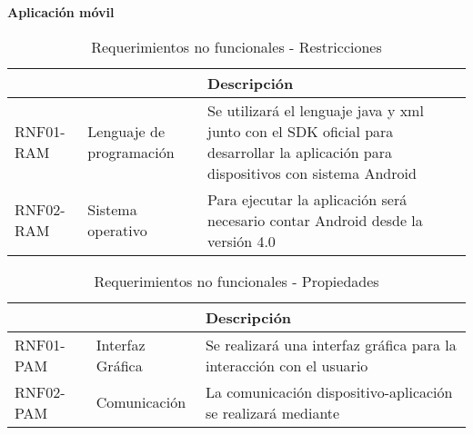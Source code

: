 \textbf{Aplicación móvil}
\begin{center}
\begin{table}[!htb]
\centering
\begin{tabular}{|p{4cm}|p{4cm}|p{5cm}|}
    \hline
    \centering {\bfseries }  & \centering {\bfseries Nombre} & {\bfseries Descripción} \\ \hline
    \centering RNF01-RAM & \centering Lenguaje de programación & Se utilizará el lenguaje java y xml junto con el SDK oficial para desarrollar la aplicación para dispositivos con sistema Android \\ \hline
    \centering RNF02-RAM & \centering Sistema operativo & Para ejecutar la aplicación será necesario contar Android desde la versión 4.0\\ \hline
\end{tabular}
\caption{Requerimientos no funcionales - Restricciones}
\label{tabla:pobconlimsincolo}
\end{table}
\end{center}
    

\begin{center}
\begin{table}[!htb]
\centering
\begin{tabular}{|p{4cm}|p{4cm}|p{5cm}|}
    \hline
    \centering {\bfseries }  & \centering {\bfseries Nombre} & {\bfseries Descripción} \\ \hline
    \centering RNF01-PAM & \centering Interfaz Gráfica & Se realizará una interfaz gráfica para la interacción con el usuario \\ \hline 
    \centering RNF02-PAM &  \centering Comunicación & La comunicación dispositivo-aplicación se realizará mediante \\
    \hline
\end{tabular}
\caption{Requerimientos no funcionales - Propiedades}
\label{tabla:pobconlimsincolo}
\end{table}
\end{center}
